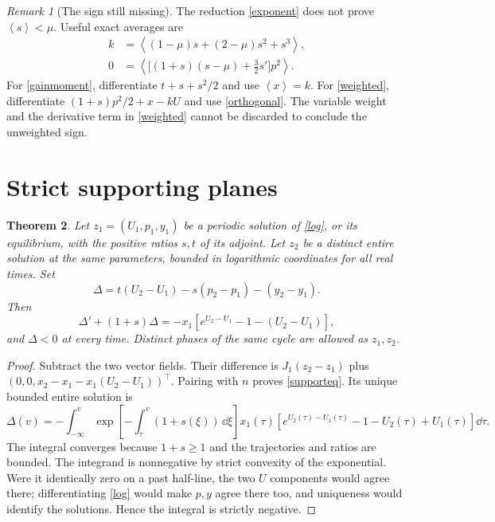 \documentclass[11pt,a4paper]{article}
\newtheorem{theorem}{Theorem}[section]\newtheorem{lemma}[theorem]{Lemma}
\theoremstyle{remark}\newtheorem{remark}[theorem]{Remark}
\newcommand{\av}[1]{\left\langle #1\right\rangle}
\begin{document}
\begin{remark}[The sign still missing]\label{signmissing}
The reduction \eqref{exponent} does not prove $\av{s}<\mu$. Useful exact averages are
\begin{align}
 k&=\av{(1-\mu)s+(2-\mu)s^2+s^3},\label{gainmoment}\\
 0&=\av{\bigl[(1+s)(s-\mu)+\tfrac32s'\bigr]p^2}.\label{weighted}
\end{align}
For \eqref{gainmoment}, differentiate $t+s+s^2/2$ and use $\av{x}=k$. For \eqref{weighted}, differentiate $(1+s)p^2/2+x-kU$ and use \eqref{orthogonal}. The variable weight and the derivative term in \eqref{weighted} cannot be discarded to conclude the unweighted sign.
\end{remark}

\section{Strict supporting planes}
\begin{theorem}\label{support}
Let $z_1=(U_1,p_1,y_1)$ be a periodic solution of \eqref{log}, or its equilibrium, with the positive ratios $s,t$ of its adjoint. Let $z_2$ be a distinct entire solution at the same parameters, bounded in logarithmic coordinates for all real times. Set
\[
 \Delta=t(U_2-U_1)-s(p_2-p_1)-(y_2-y_1).
\]
Then
\begin{equation}\label{supporteq}
 \Delta'+(1+s)\Delta
 =-x_1\left[e^{U_2-U_1}-1-(U_2-U_1)\right],
\end{equation}
and $\Delta<0$ at every time. Distinct phases of the same cycle are allowed as $z_1,z_2$.
\end{theorem}
\begin{proof}
Subtract the two vector fields. Their difference is $J_1(z_2-z_1)$ plus $(0,0,x_2-x_1-x_1(U_2-U_1))^\top$. Pairing with $n$ proves \eqref{supporteq}. Its unique bounded entire solution is
\[
 \Delta(v)=-\int_{-\infty}^v
 \exp\!\left[-\int_\tau^v(1+s(\xi))\,\dd\xi\right]
 x_1(\tau)\left[e^{U_2(\tau)-U_1(\tau)}-1-U_2(\tau)+U_1(\tau)\right]\dd\tau.
\]
The integral converges because $1+s\ge1$ and the trajectories and ratios are bounded. The integrand is nonnegative by strict convexity of the exponential. Were it identically zero on a past half-line, the two $U$ components would agree there; differentiating \eqref{log} would make $p,y$ agree there too, and uniqueness would identify the solutions. Hence the integral is strictly negative.
\end{proof}
\end{document}
